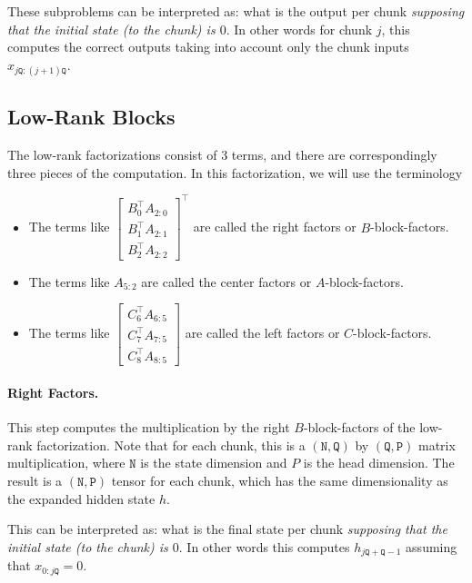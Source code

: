 \documentclass{article}
\begin{document}
These subproblems can be interpreted as: what is the output per chunk \emph{supposing that the initial state (to the chunk) is $0$}.
In other words for chunk $j$, this computes the correct outputs taking into account only the chunk inputs $x_{j\mathtt{Q}:(j+1)\mathtt{Q}}$.

\subsection{Low-Rank Blocks}

The low-rank factorizations consist of 3 terms, and there are correspondingly three pieces of the computation.
In this factorization, we will use the terminology
\begin{itemize}
  \item The terms like $\begin{bmatrix}B_0^{\top} A_{2:0} \\[1pt] B_1^{\top}A_{2:1} \\[1pt] B_2^{\top}A_{2:2}\end{bmatrix}^{\top}$ are called the right factors or $B$-block-factors.
  \item The terms like $A_{5:2}$ are called the center factors or $A$-block-factors.
  \item The terms like $\begin{bmatrix}C_6^{\top} A_{6:5} \\[1pt] C_7^{\top} A_{7:5} \\[1pt] C_8^{\top} A_{8:5}\end{bmatrix}$ are called the left factors or $C$-block-factors.
\end{itemize}

\paragraph{Right Factors.}

This step computes the multiplication by the right $B$-block-factors of the low-rank factorization.
Note that for each chunk, this is a $(\mathtt{N}, \mathtt{Q})$ by $(\mathtt{Q}, \mathtt{P})$ matrix multiplication, where $\mathtt{N}$ is the state dimension and $P$ is the head dimension.
The result is a $(\mathtt{N}, \mathtt{P})$ tensor for each chunk, which has the same dimensionality as the expanded hidden state $h$.

This can be interpreted as: what is the final state per chunk \emph{supposing that the initial state (to the chunk) is $0$}.
In other words this computes $h_{j\mathtt{Q}+\mathtt{Q}-1}$ assuming that $x_{0:j\mathtt{Q}} = 0$.
\end{document}
